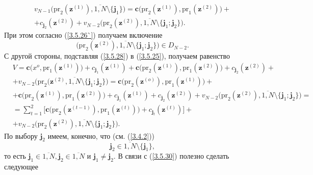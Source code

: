 \documentclass[11pt,twoside,openany]{report}
\newcommand{\bfn}{\begin{equation}}
\newcommand{\efn}{\end{equation}}
\newcommand{\ov}{\overline}
\newcommand{\sm}{\setminus}
\begin{document}
{\begin{eqnarray}
&v_{N-1}\bigl(\mathrm{pr}_2(\mathbf{z}^{(1)}),\ov{1,N}\sm\{\mathbf{j}_1\}\bigl) =
\mathbf{c}\bigl(\mathrm{pr}_2(\mathbf{z}^{(1)}),\mathrm{pr}_1(\mathbf{z}^{(2)})) +
&\nonumber\\
&+c_{\mathbf{j}_2}(\mathbf{z}^{(2)}) + v_{N-2}\bigl(\mathrm{pr}_2(\mathbf{z}^{(2)}),
\ov{1,N}\sm\{\mathbf{j}_1;\mathbf{j}_2\}\bigl).
\label{3.5.28}
\end{eqnarray}
При этом согласно (\ref{3.5.26`}) получаем включение
\bfn\label{3.5.28}
\bigl(\mathrm{pr}_2(\mathbf{z}^{(2)}),\ov{1,N}\sm\{\mathbf{j}_1;\mathbf{j}_2\}\bigl)\in D_{N-2}.
\efn
С другой стороны, подставляя  (\ref{3.5.28}) в (\ref{3.5.25}), получаем равенство
\begin{eqnarray}
&V = \mathbf{c}\bigl(x^o,\mathrm{pr}_1(\mathbf{z}^{(1)})\bigl) +
c_{\mathbf{j}_1}(\mathbf{z}^{(1)}) + \mathbf{c}\bigl(\mathrm{pr}_2(\mathbf{z}^{(1)}),
\mathrm{pr}_1(\mathbf{z}^{(2)})\bigl) + c_{\mathbf{j}_2}(\mathbf{z}^{(2)}) +
&\nonumber\\
&+v_{N-2}\bigl(\mathrm{pr}_2(\mathbf{z}^{(2)},\ov{1,N}\sm\{\mathbf{j}_1;\mathbf{j}_2\}\bigl) =
\mathbf{c}\bigl(\mathrm{pr}_2(\mathbf{z}^{(o)}),\mathrm{pr}_1(\mathbf{z}^{(1)})\bigl) +
&\nonumber\\
&+ \mathbf{c}\bigl(\mathrm{pr}_2(\mathbf{z}^{(1)}),\mathrm{pr}_1(\mathbf{z}^{(2)})\bigl) +
c_{\mathbf{j}_1}(\mathbf{z}^{(1)}) + c_{\mathbf{j}_2}(\mathbf{z}^{(2)}) +
v_{N-2}\bigl(\mathrm{pr}_2(\mathbf{z}^{(2)}),\ov{1,N}\sm\{\mathbf{j}_1;\mathbf{j}_2\}\bigl) =
&\nonumber\\
&= \sum\limits_{t=1}^2 \bigl[\mathbf{c}\bigl(\mathrm{pr}_2(\mathbf{z}^{(t-1)}),
\mathrm{pr}_1(\mathbf{z}^{(t)})\bigl) + c_{\mathbf{j}_t}(\mathbf{z}^{(t)})\bigl] +
&\nonumber\\
&+v_{N-2}\bigl(\mathrm{pr}_2(\mathbf{z}^{(2)}),\ov{1,N}\sm\{\mathbf{j}_1;\mathbf{j}_2\}\bigl).
&\label{3.5.30}
\end{eqnarray}
По выбору $\mathbf{j}_2$ имеем, конечно, что (см. (\ref{3.4.2}))
\bfn\label{3.5.31`}\mathbf{j}_2 \in \ov{1,N}\sm\{\mathbf{j}_1\},
\efn
то есть $\mathbf{j}_1\in \ov{1,N}, \mathbf{j}_2\in \ov{1,N}$ и $\mathbf{j}_1 \neq
\mathbf{j}_2.$ В связи с (\ref{3.5.30}) полезно сделать следующее

}
\end{document}
